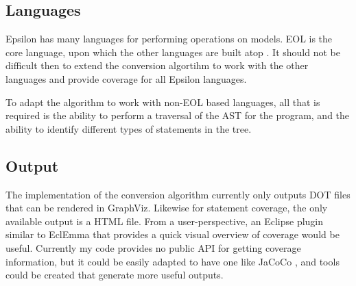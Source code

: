 \subsection{Languages}

Epsilon has many languages for performing operations on models. EOL is the core language, upon which the other languages are built atop \citep{epsilonBook}. It should not be difficult then to extend the conversion algortihm to work with the other languages and provide coverage for all Epsilon languages.

To adapt the algorithm to work with non-EOL based languages, all that is required is the ability to perform a traversal of the AST for the program, and the ability to identify different types of statements in the tree.

\subsection{Output}
The implementation of the conversion algorithm currently only outputs DOT files that can be rendered in GraphViz. Likewise for statement coverage, the only available output is a HTML file. From a user-perspective, an Eclipse plugin similar to EclEmma that provides a quick visual overview of coverage would be useful. Currently my code provides no public API for getting coverage information, but it could be easily adapted to have one like JaCoCo \citep{JaCoCo}, and tools could be created that generate more useful outputs.

